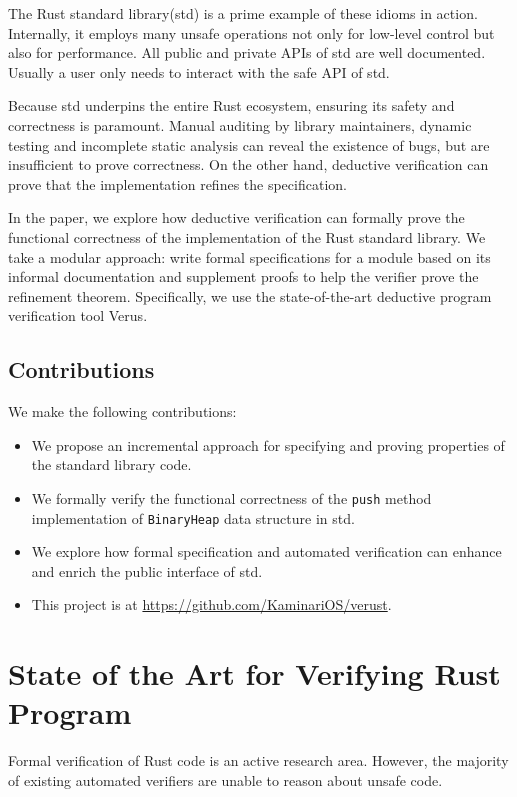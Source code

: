 \documentclass[conference]{IEEEtran}
\begin{document}
The Rust standard library(std) is a prime example of these idioms in action. Internally, it employs many unsafe operations not only for low-level control but also for performance. All public and private APIs of std are well documented. Usually a user only needs to interact with the safe API of std.  


Because std underpins the entire Rust ecosystem, ensuring its safety and correctness is paramount. Manual auditing by library maintainers, dynamic testing and incomplete static analysis can reveal the existence of bugs, but are insufficient to prove correctness. On the other hand, deductive verification can prove that the implementation refines the specification.           


In the paper, we explore how deductive verification can formally prove the functional correctness of the implementation of the Rust standard library. We take a modular approach: write formal specifications for a module based on its informal documentation and supplement proofs to help the verifier prove the refinement theorem. Specifically, we use the state-of-the-art deductive program verification tool Verus\cite{verus}. 

\subsection{Contributions}
We make the following contributions:
\begin{itemize}
        \item We propose an incremental approach for specifying and proving properties of the standard library code.
        \item We formally verify the functional correctness of the \texttt{push} method implementation of \texttt{BinaryHeap} data structure in std.
        \item We explore how formal specification and automated verification can enhance and enrich the public interface of std. 
        \item This project is at \href{https://github.com/KaminariOS/verust}{https://github.com/KaminariOS/verust}.
\end{itemize}
        
\section{State of the Art for Verifying Rust Program}
Formal verification of Rust code is an active research area. However, the majority of existing automated verifiers\cite{Prusti,Creusot} are unable to reason about unsafe code. 
\end{document}
